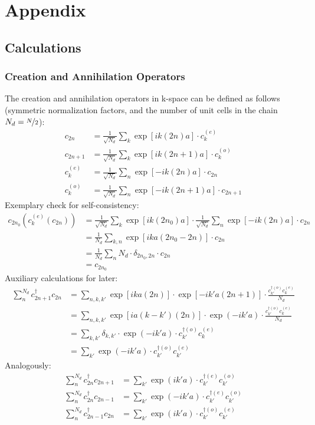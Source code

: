 \chapter{Appendix}
\label{chapter_appendix}
\section{Calculations}
\subsection*{Creation and Annihilation Operators}
The creation and annihilation operators in k-space can be defined as follows (symmetric normalization factors, and the number of unit cells in the chain $N_d = \nicefrac{N}{2}$):
\begin{align}
c_{2n} &= \frac{1}{\sqrt{N_d}}\sum_k\exp\left[ik\left(2n\right)a\right]\cdot c_{k}^{(e)}\\
c_{2n+1} &= \frac{1}{\sqrt{N_d}}\sum_k\exp\left[ik\left(2n+1\right)a\right]\cdot c_{k}^{(o)}\\
c_k^{(e)} &= \frac{1}{\sqrt{N_d}}\sum_n \exp\left[-ik\left(2n\right)a\right]\cdot c_{2n}\\
c_k^{(o)} &= \frac{1}{\sqrt{N_d}}\sum_n \exp\left[-ik\left(2n+1\right)a\right]\cdot c_{2n+1}
\end{align}
Exemplary check for self-consistency:
\begin{align}
c_{2n_0}\left(c_k^{(e)}(c_{2n})\right) &= \frac{1}{\sqrt{N_d}}\sum_k\exp\left[ik\left(2n_0\right)a\right]\cdot \frac{1}{\sqrt{N_d}}\sum_n \exp\left[-ik\left(2n\right)a\right]\cdot c_{2n}\\
&= \frac{1}{N_d}\sum_{k, n} \exp\left[ika\left(2n_0-2n\right)\right]\cdot c_{2n}\\
&= \frac{1}{N_d}\sum_n N_d\cdot \delta_{2n_0,2n}\cdot c_{2n}\\
&= c_{2n_0}
\end{align}
Auxiliary calculations for later:
\begin{align}
\sum_n^{N_d}c_{2n+1}^\dagger c_{2n} &=\sum_{n, k, k'} \exp\left[ika(2n)\right] \cdot \exp\left[-ik'a(2n+1)\right] \cdot \frac{c_{k'}^{\dagger(o)}c_k^{(e)}}{N_d} \\
&=\sum_{n, k, k'} \exp\left[ia(k-k')(2n)\right] \cdot \exp\left(-ik'a\right) \cdot  \frac{c_{k'}^{\dagger(o)}c_k^{(e)}}{N_d} \\
&=\sum_{k, k'} \delta_{k, k'} \cdot \exp\left(-ik'a\right)\cdot c_{k'}^{\dagger(o)}c_k^{(e)}\\
&=\sum_{k'} \exp\left(-ik'a\right) \cdot c_{k'}^{\dagger(o)}c_{k'}^{(e)}
\end{align}
Analogously:
\begin{align}
\sum_n^{N_d} c_{2n}^\dagger c_{2n+1} &=\sum_{k'} \exp\left(ik'a\right)\cdot c_{k'}^{\dagger(e)}c_{k'}^{(o)}\\
\sum_n^{N_d} c_{2n}^\dagger c_{2n-1}&=\sum_{k'} \exp\left(-ik'a\right)\cdot  c_{k'}^{\dagger(e)}c_{k'}^{(o)}\\
\sum_n^{N_d} c_{2n-1}^\dagger c_{2n} &=\sum_{k'} \exp\left(ik'a\right)\cdot  c_{k'}^{\dagger(o)}c_{k'}^{(e)}
\end{align}
